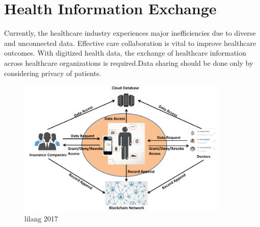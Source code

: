 \documentclass[12pt]{report}
\begin{document}
\section{Health Information Exchange}
Currently, the healthcare industry experiences major inefficiencies due to diverse and unconnected data. Effective care collaboration is vital to improve healthcare outcomes. With digitized health data, the exchange of healthcare information across healthcare organizations is required.Data sharing should be done only by considering privacy of patients.
\begin{figure}[H]
\centering
\includegraphics[width=0.9\textwidth]{centric.png}
\caption{lilang 2017}
\label{ppr}
\end{figure}
\end{document}
